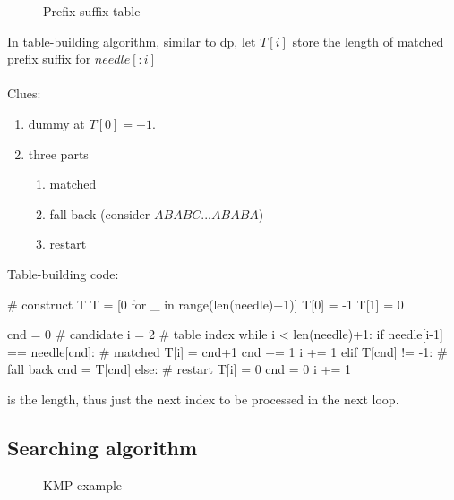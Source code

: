 \begin{figure}[hbtp]
\centering
{}
\caption{Prefix-suffix table}
\label{fig:kmp_table}
\end{figure}
In table-building algorithm, similar to dp, let $T[i]$ store the length of matched prefix suffix for $needle[:i]$\\
\\
Clues:
\begin{enumerate}
\item dummy at $T[0]=-1$.
\item three parts
\begin{enumerate}
\item matched
\item fall back (consider $ABABC...ABABA$)
\item restart 
\end{enumerate}
\end{enumerate}
Table-building code:
\begin{python}
# construct T
T = [0 for _ in range(len(needle)+1)]
T[0] = -1
T[1] = 0

cnd = 0  # candidate 
i = 2  # table index
while i < len(needle)+1:
    if needle[i-1] == needle[cnd]:  # matched
        T[i] = cnd+1
        cnd += 1
        i += 1
    elif T[cnd] != -1:  # fall back 
        cnd = T[cnd]
    else:  # restart 
        T[i] = 0
        cnd = 0
        i += 1
\end{python}

 is the length, thus just the next index to be processed in the next loop. 
\subsection{Searching algorithm}
\begin{figure}[]
\centering
{}
\caption{KMP example}
\label{fig:kmp_presuffix}
\end{figure}

